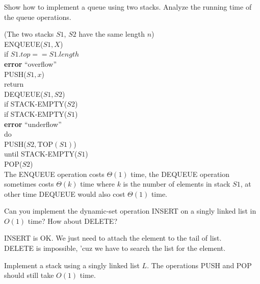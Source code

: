 \documentclass[12pt, a4paper, UTF8]{ctexart}
\begin{document}
\begin{problem}[TC: 10.1-6]
  Show how to implement a queue using two stacks. Analyze the running time of 
  the queue operations.
\end{problem}

\begin{solution}
  (The two stacks $S1$, $S2$ have the same length $n$)\\
  ENQUEUE($S1,X$)\\
  \indent if $S1.top == S1.length$\\
  \indent\indent \textbf{error} ``overflow''\\
  \indent PUSH($S1,x$)\\
  \indent return\\
  DEQUEUE($S1,S2$)\\
  \indent if STACK-EMPTY($S2$)\\
  \indent\indent if STACK-EMPTY($S1$)\\
  \indent\indent\indent \textbf{error} ``underflow''\\
  \indent\indent do\\
  \indent\indent\indent PUSH($S2,\text{TOP}(S1)$)\\
  \indent\indent until STACK-EMPTY($S1$)\\
  \indent POP($S2$)\\
  The ENQUEUE operation costs $\Theta(1)$ time, the DEQUEUE operation sometimes 
  costs $\Theta(k)$ time where $k$ is the number of elements in stack $S1$, at 
  other time DEQUEUE would also cost $\Theta(1)$ time.
\end{solution}

\begin{problem}[TC: 10.2-1]
  Can you implement the dynamic-set operation INSERT on a singly linked list in 
  $O(1)$ time? How about DELETE?
\end{problem}

\begin{solution}
  INSERT is OK. We just need to attach the element to the tail of list.\\
  DELETE is impossible, 'cuz we have to search the list for the element.
\end{solution}

\begin{problem}[TC: 10.2-2]
  Implement a stack using a singly linked list $L$. The operations PUSH and POP 
  should still take $O(1)$ time.
\end{problem}
\end{document}
